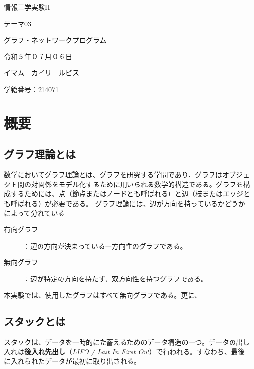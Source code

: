 \documentclass[a4j, titlepage]{jarticle}
\begin{document}
  \begin{center}
  \huge 情報工学実験II\par
  \vspace{15mm}
  \huge テーマ03 \par
  \huge グラフ・ネットワークプログラム \par
  \vspace{15mm}
  \vspace{20mm}
  \vspace{100mm}
  \Large 令和５年０７月０６日 \par
  \vspace{15mm}
  \Large イマム　カイリ　ルビス \par
  \vspace{10mm}
  \Large 学籍番号：214071\par
  \vspace{10mm}
\end{center}
\clearpage

\tableofcontents
\clearpage

\section{概要}
    \subsection{グラフ理論とは}
    数学においてグラフ理論とは、グラフを研究する学問であり、グラフはオブジェクト間の対関係をモデル化するために用いられる数学的構造である。グラフを構成するためには、点（節点またはノードとも呼ばれる）と辺（枝またはエッジとも呼ばれる）が必要である\cite{bib:wikigraph}。 
    グラフ理論には、辺が方向を持っているかどうかによって分れている
    \begin{description}
        \item[有向グラフ]：辺の方向が決まっている一方向性のグラフである。
        \item[無向グラフ]：辺が特定の方向を持たず、双方向性を持つグラフである。
    \end{description}
    本実験では、使用したグラフはすべて無向グラフである。更に、

    \subsection{スタックとは} 
    スタックは、データを一時的にた蓄えるためのデータ構造の一つ。データの出し入れは\textbf{後入れ先出し}（\textit{LIFO / Last In First Out}）で行われる。すなわち、最後に入れられたデータが最初に取り出される\cite{bib:boyoh}。
\end{document}
